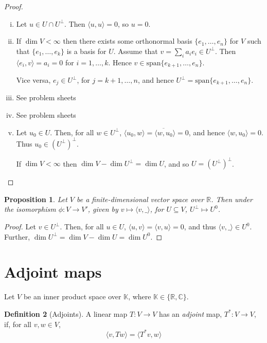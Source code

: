\documentclass[10pt,fleqn]{article}
\newcommand{\spa}{\mathrm{span}}
\newcommand{\comps}{\mathbb{C}}
\newcommand{\reals}{\mathbb{R}}
\theoremstyle{definition} \newtheorem{defn}{Definition}[section]
\theoremstyle{plain}      \newtheorem{thm}[defn]{Theorem}
\theoremstyle{plain}      \newtheorem{prop}[defn]{Proposition}
\theoremstyle{plain}      \newtheorem{lem}[defn]{Lemma}
\theoremstyle{plain}      \newtheorem{cor}[defn]{Corollary}
\theoremstyle{plain}      \newtheorem{ad}[defn]{Addendum}
\theoremstyle{definition} \newtheorem{ex}[defn]{Example}
\theoremstyle{definition} \newtheorem{rem}[defn]{Remark}
\numberwithin{equation}{subsection}
\begin{document}
\begin{proof}
    \begin{enumerate}[(i)]
        \item Let $u\in U\cap U^{\perp}$.
        Then $\langle u,u\rangle=0$, so $u=0$.
        \item If $\dim V<\infty$ then there exists some orthonormal basis $\{e_1,\ldots,e_n\}$ for $V$ such that $\{e_1,\ldots,e_k\}$ is a basis for $U$.
        Assume that $v=\sum_i a_ie_i\in U^{\perp}$.
        Then $\langle e_i,v\rangle=a_i=0$ for $i=1,\ldots,k$.
        Hence $v\in\spa\{e_{k+1},\ldots,e_n\}$.

        Vice versa, $e_j\in U^{\perp}$, for $j=k+1,\ldots,n$, and hence $U^{\perp}=\spa\{e_{k+1},\ldots,e_n\}$.
        \item See problem sheets
        \item See problem sheets
        \item Let $u_0\in U$.
        Then, for all $w\in U^{\perp}$, $\langle u_0,w\rangle=\overline{\langle w,u_0}\rangle=0$, and hence $\langle w,u_0\rangle=0$.
        Thus $u_0\in (U^{\perp})^{\perp}$.

        If $\dim V<\infty$ then $\dim V-\dim U^{\perp}=\dim U$, and so $U=(U^{\perp})^{\perp}$.
    \end{enumerate}
\end{proof}

\begin{prop}
    Let $V$ be a finite-dimensional vector space over $\reals$.
    Then under the isomorphism $\phi:V\to V'$, given by $v\mapsto\langle v,\_\rangle$, for $U\subseteq V$, $U^{\perp}\mapsto U^0$.
\end{prop}

\begin{proof}
    Let $v\in U^{\perp}$.
    Then, for all $u\in U$, $\langle u,v\rangle=\langle v,u\rangle=0$, and thus $\langle v,\_\rangle\in U^0$.
    Further, $\dim U^{\perp}=\dim V-\dim U=\dim U^0$.
\end{proof}


\section{Adjoint maps}

Let $V$ be an inner product space over $\mathbb{K}$, where $\mathbb{K}\in\{\reals,\comps\}$.

\begin{defn}[Adjoints]
    A linear map $T:V\to V$ has an \emph{adjoint} map, $T^*:V\to V$, if, for all $v,w\in V$,
    \[
        \langle v,Tw\rangle=
        \langle T^*v,w\rangle
    \]
\end{defn}
\end{document}
